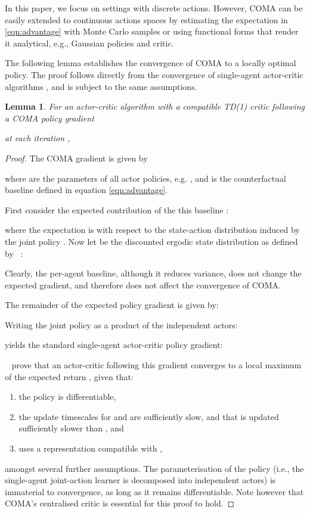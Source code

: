 \documentclass[letterpaper]{article}
\newcommand{\citet}[1]{\citeauthor{#1}~\shortcite{#1}}
\newcommand{\citep}{\cite}
\newtheorem{lemma}{Lemma}
\begin{document}
In this paper, we focus on settings with discrete actions. However, COMA can be 
easily extended to continuous actions spaces by estimating the expectation in  
\eqref{eqn:advantage} with Monte Carlo samples or using functional forms that 
render it analytical, e.g., Gaussian policies and critic.

The following lemma establishes the convergence of COMA to a locally optimal policy.  The proof follows directly 
from the convergence of single-agent actor-critic algorithms 
\citep{sutton1999policy,konda2000actor}, and is subject to the same assumptions.

\begin{lemma}
For an actor-critic algorithm with a compatible TD(1) critic following a COMA 
policy gradient

at each iteration ,

\end{lemma}
\begin{proof}
The COMA gradient is given by

where  are the parameters of all actor policies, e.g. , and  is the counterfactual 
baseline defined in equation \ref{eqn:advantage}.

First consider the expected contribution of the this baseline :

where the expectation  is with respect to the state-action 
distribution 
induced by the joint policy . Now let  be the discounted 
ergodic state distribution as defined by \citet{sutton1999policy}:

Clearly, the per-agent baseline, although it reduces variance, does not change 
the expected gradient, and 
therefore does not affect the convergence of COMA. 

The remainder of the expected policy gradient is given by:

Writing the joint policy as a product of the independent actors:

yields the standard single-agent actor-critic policy gradient:


\citet{konda2000actor} prove that an actor-critic 
following this gradient converges to a local maximum of the expected return 
, given that:
\begin{enumerate}
	\item the policy  is differentiable,
	\item the update timescales for  and  are sufficiently slow, and 
	that 
	 is updated sufficiently slower than , and
	\item  uses a representation compatible with ,
\end{enumerate}
amongst several further assumptions. The parameterisation of the 
policy (i.e., the single-agent joint-action learner is decomposed into 
independent actors) is immaterial to convergence, as long as it remains 
differentiable. Note however that COMA's centralised critic is essential for 
this proof to hold.
\end{proof}
\end{document}
